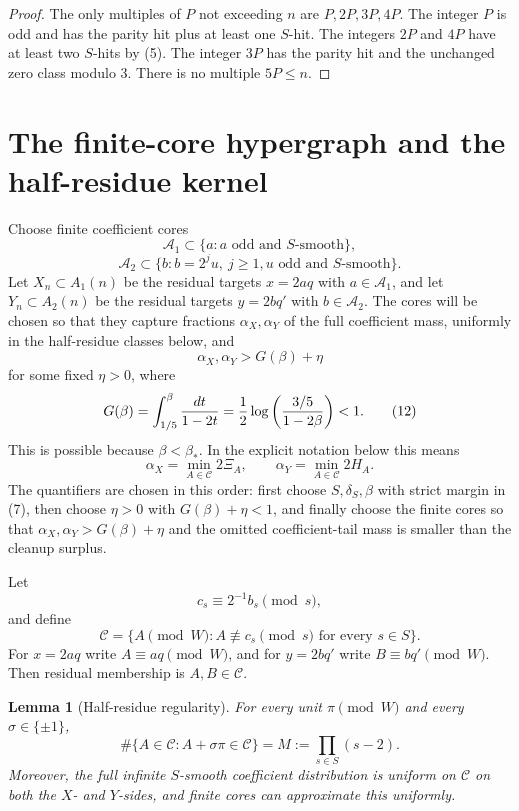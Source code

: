 \documentclass[11pt]{article}
\newtheorem{lemma}[theorem]{Lemma}
\newcommand{\C}{\mathcal C}
\begin{document}
\begin{proof}
The only multiples of $P$ not exceeding $n$ are $P,2P,3P,4P$.  The integer $P$
is odd and has the parity hit plus at least one $S$-hit.  The integers $2P$ and
$4P$ have at least two $S$-hits by (5).  The integer $3P$ has the parity hit and
the unchanged zero class modulo $3$.  There is no multiple $5P\le n$.
\end{proof}

\section{The finite-core hypergraph and the half-residue kernel}

Choose finite coefficient cores
\[
  \mathcal A_1\subset\{a:a\text{ odd and }S\text{-smooth}\},
\]
\[
  \mathcal A_2\subset\{b:b=2^j u,\ j\ge1,
       u\text{ odd and }S\text{-smooth}\}.
\]
Let $X_n\subset A_1(n)$ be the residual targets $x=2aq$ with
$a\in\mathcal A_1$, and let $Y_n\subset A_2(n)$ be the residual targets
$y=2bq'$ with $b\in\mathcal A_2$.  The cores will be chosen so that they capture
fractions $\alpha_X,\alpha_Y$ of the full coefficient mass, uniformly in the
half-residue classes below, and
\[
  \alpha_X,
  \alpha_Y>G(\beta)+\eta                                    \tag{11}
\]
for some fixed $\eta>0$, where
\[
  G(\beta)=\int_{1/5}^{\beta}{dt\over1-2t}
  ={1\over2}\log\left({3/5\over1-2\beta}\right)<1.            \tag{12}
\]
This is possible because $\beta<\beta_*$.
In the explicit notation below this means
\[
  \alpha_X=\min_{A\in\C}2\Xi_A,\qquad
  \alpha_Y=\min_{A\in\C}2H_A.
\]
The quantifiers are chosen in this order: first choose $S,\delta_S,\beta$ with
strict margin in (7), then choose $\eta>0$ with $G(\beta)+\eta<1$, and finally
choose the finite cores so that $\alpha_X,\alpha_Y>G(\beta)+\eta$ and the
omitted coefficient-tail mass is smaller than the cleanup surplus.

Let
\[
  c_s\equiv2^{-1}b_s\pmod s,
\]
and define
\[
  \C=\{A\pmod W:A\not\equiv c_s\pmod s\text{ for every }s\in S\}.
\]
For $x=2aq$ write $A\equiv aq\pmod W$, and for $y=2bq'$ write
$B\equiv bq'\pmod W$.  Then residual membership is $A,B\in\C$.

\begin{lemma}[Half-residue regularity]
For every unit $\pi\pmod W$ and every $\sigma\in\{\pm1\}$,
\[
  \#\{A\in\C:A+\sigma\pi\in\C\}=M:=\prod_{s\in S}(s-2).       \tag{13}
\]
Moreover, the full infinite $S$-smooth coefficient distribution is uniform on
$\C$ on both the $X$- and $Y$-sides, and finite cores can approximate this
uniformly.
\end{lemma}
\end{document}

